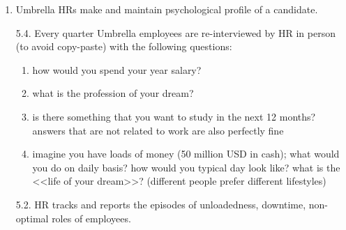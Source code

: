 \documentclass[11pt]{article}
\theoremstyle{remark}
\theoremstyle{definition}
\begin{document}
\begin{enumerate}

\item Umbrella HRs make and maintain psychological profile of a candidate. 


\item[5.4.] Every quarter Umbrella employees are re-interviewed by HR in person (to avoid copy-paste) with the following questions:

\begin{enumerate}

\item how would you spend your year salary?

\item what is the profession of your dream?

\item is there something that you want to study in the next 12 months? answers that are not related to work are also perfectly fine 

\item imagine you have loads of money (50 million USD in cash); what would you do on daily basis? how would you typical day look like? what is the <<life of your dream>>? (different people prefer different lifestyles)
\end{enumerate}

\item[5.2.] HR tracks and reports the episodes of unloadedness, downtime, non-optimal roles of employees.






\end{enumerate}
\end{document}
